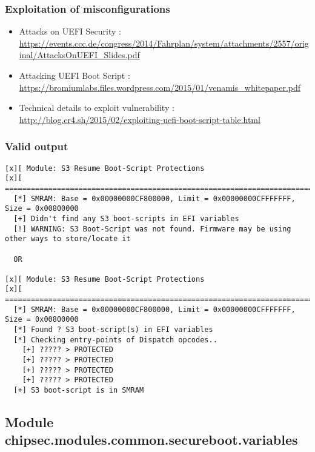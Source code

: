 \hypertarget{exploitation-of-misconfigurations}{%
\subsubsection{Exploitation of
misconfigurations}\label{exploitation-of-misconfigurations}}

\begin{itemize}
\tightlist
\item
  Attacks on UEFI Security :
  \url{https://events.ccc.de/congress/2014/Fahrplan/system/attachments/2557/original/AttacksOnUEFI_Slides.pdf}
\item
  Attacking UEFI Boot Script :
  \url{https://bromiumlabs.files.wordpress.com/2015/01/venamis_whitepaper.pdf}
\item
  Technical details to exploit vulnerability :
  \url{http://blog.cr4.sh/2015/02/exploiting-uefi-boot-script-table.html}
\end{itemize}

\hypertarget{valid-output-19}{%
\subsubsection{Valid output}\label{valid-output-19}}

\begin{verbatim}
[x][ Module: S3 Resume Boot-Script Protections
[x][ =======================================================================
  [*] SMRAM: Base = 0x00000000CF800000, Limit = 0x00000000CFFFFFFF, Size = 0x00800000
  [+] Didn't find any S3 boot-scripts in EFI variables
  [!] WARNING: S3 Boot-Script was not found. Firmware may be using other ways to store/locate it

  OR

[x][ Module: S3 Resume Boot-Script Protections
[x][ =======================================================================
  [*] SMRAM: Base = 0x00000000CF800000, Limit = 0x00000000CFFFFFFF, Size = 0x00800000
  [*] Found ? S3 boot-script(s) in EFI variables
  [*] Checking entry-points of Dispatch opcodes..
    [+] ????? > PROTECTED
    [+] ????? > PROTECTED
    [+] ????? > PROTECTED
    [+] ????? > PROTECTED
  [+] S3 boot-script is in SMRAM
\end{verbatim}

\hypertarget{module-chipsec.modules.common.secureboot.variables}{%
\subsection{Module
chipsec.modules.common.secureboot.variables}\label{module-chipsec.modules.common.secureboot.variables}}


